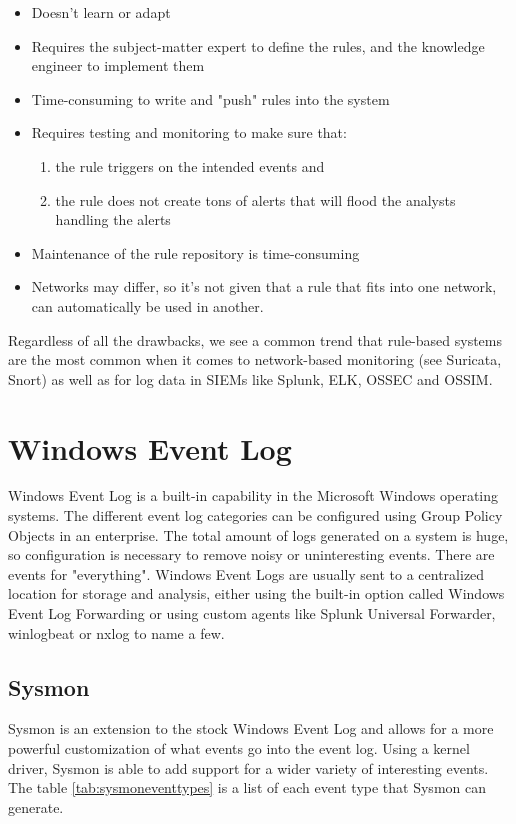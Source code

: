 \begin{itemize}
    \item Doesn't learn or adapt
    \item Requires the subject-matter expert to define the rules, and the knowledge engineer to implement them
    \item Time-consuming to write and "push" rules into the system
    \item Requires testing and monitoring to make sure that:
    \begin{enumerate}
        \item the rule triggers on the intended events and
        \item the rule does not create tons of alerts that will flood the analysts handling the alerts
    \end{enumerate} 
    \item Maintenance of the rule repository is time-consuming
    \item Networks may differ, so it's not given that a rule that fits into one network, can automatically be used in another.
\end{itemize}

Regardless of all the drawbacks, we see a common trend that rule-based systems are the most common when it comes to network-based monitoring (see Suricata, Snort) as well as for log data in SIEMs like Splunk, ELK, OSSEC and OSSIM.

\section{Windows Event Log}

Windows Event Log is a built-in capability in the Microsoft Windows operating systems. The different event log categories can be configured using Group Policy Objects in an enterprise. The total amount of logs generated on a system is huge, so configuration is necessary to remove noisy or uninteresting events.
There are events for "everything". 
Windows Event Logs are usually sent to a centralized location for storage and analysis, either using the built-in option called Windows Event Log Forwarding or using custom agents like Splunk Universal Forwarder, winlogbeat or nxlog to name a few.

\subsection{Sysmon}
Sysmon is an extension to the stock Windows Event Log and allows for a more powerful customization of what events go into the event log. Using a kernel driver, Sysmon is able to add support for a wider variety of interesting events. The table \ref{tab:sysmoneventtypes} is a list of each event type that Sysmon can generate.

